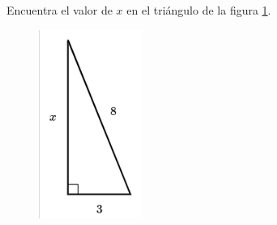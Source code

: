 \question[15]  Encuentra el valor de $x$ en el triángulo de la figura \ref{fig:lados_pitagoras_32}.
\begin{figure}[H]
    \begin{center}
        \includegraphics[width=0.3\textwidth]{../images/lados_pitagoras_32.png}
    \end{center}
    \caption{}
    \label{fig:lados_pitagoras_32}
\end{figure}